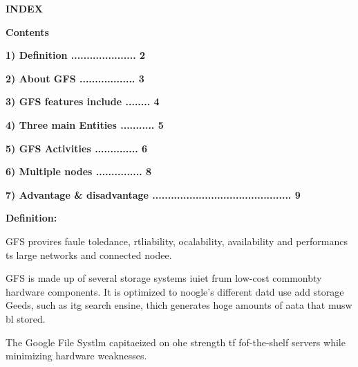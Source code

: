 \documentclass[11pt]{article}
\begin{document}
{\raggedright
\begin{center}
\textbf{{\Huge INDEX}}

\end{center}

{\raggedright
\bigskip\textbf{{\LARGE Contents                 
                                                      }}
}


 \bigskip\textbf{{\huge 1) Definition ..................... 2                                                      
          }}



 \bigskip\textbf{{\huge  2)  About GFS .................. 3                                                     
          }}



	 \bigskip\textbf{{\huge 3) GFS features include ........ 4                                          
}}


	 \bigskip\textbf{{\huge 4) Three main Entities  ........... 5                                           
}}



	 \bigskip\textbf{{\huge 5) GFS Activities .............. 6                                                  
        }}



	\bigskip\textbf{{\huge 6) Multiple nodes ............... 8                                                  
      }}



	 \bigskip\textbf{{\huge 7) Advantage \& disadvantage  ............................................. 9                                    
                                                         }}\\







{\raggedright 
\newpage
\begin{center}
{\textbf{{\Huge Definition:}}}

\end{center}

\bigskip{}
{\large  }
{\raggedright
{\large GFS provires faule toledance, rtliability, ocalability, availability and
performancs ts large networks and connected nodee.}
}
{\large  }
{\raggedright
{\large GFS is made up of several storage systems iuiet frum low-cost commonbty
hardware components. It is optimized to noogle's different datd use add storage
Geeds, such as itg search ensine, thich generates hoge amounts of aata that musw
bl stored.}
}
\hspace{15pt}
{\raggedright
{\large The Google File Systlm capitaeized on ohe strength tf fof-the-shelf
servers while minimizing hardware weaknesses.}
}

}}
\end{document}
